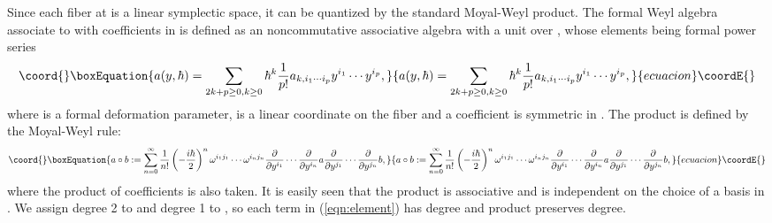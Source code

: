 \documentclass[10pt,a4paper]{article}
\def\h{\hbar}
\begin{document}
Since each fiber \coordHE{} at \coordHE{} is a linear symplectic space, it can be quantized by the standard Moyal-Weyl product. The formal Weyl algebra \coordHE{} associate to \coordHE{} with coefficients in \coordHE{} is defined as an noncommutative associative algebra with a unit over \coordHE{}, whose elements being formal power series 
\begin{equation}\coord{}\boxEquation{
\label{eqn:element}
a(y,\h)=\sum_{2k+p\geq0,k\geq0}\h^k {1\over p!}a_{k,i_1\cdots i_p}y^{i_1}\cdots y^{i_p},
}{
a(y,\h)=\sum_{2k+p\geq0,k\geq0}\h^k {1\over p!}a_{k,i_1\cdots i_p}y^{i_1}\cdots y^{i_p},
}{ecuacion}\coordE{}\end{equation}
where \myHighlight{$\h$}\coordHE{} is a formal deformation parameter, \coordHE{} is a linear coordinate on the fiber \coordHE{} and a coefficient \coordHE{} is symmetric in \coordHE{}. The product is defined by the Moyal-Weyl rule:
\begin{equation}\coord{}\boxEquation{
a\circ b:=\sum^\infty_{n=0}{1\over n!}\left(-{i\h\over2}\right)^n \omega^{i_1 j_1}\cdots\omega^{i_n j_n}{\partial\over\partial y^{i_1}}\cdots{\partial\over\partial y^{i_n}}a {\partial\over\partial y^{j_1}}\cdots{\partial\over\partial y^{j_n}}b,
}{
a\circ b:=\sum^\infty_{n=0}{1\over n!}\left(-{i\h\over2}\right)^n \omega^{i_1 j_1}\cdots\omega^{i_n j_n}{\partial\over\partial y^{i_1}}\cdots{\partial\over\partial y^{i_n}}a {\partial\over\partial y^{j_1}}\cdots{\partial\over\partial y^{j_n}}b,
}{ecuacion}\coordE{}\end{equation}
where the product of coefficients is also taken. It is easily seen that the product is associative and is independent on the choice of a basis in \coordHE{}. We assign degree 2 to \myHighlight{$\h$}\coordHE{} and degree 1 to \coordHE{}, so each term in (\ref{eqn:element}) has degree \coordHE{} and \myHighlight{$\circ$}\coordHE{} product preserves degree. \\
\end{document}
